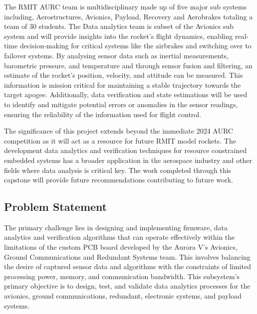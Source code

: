 The RMIT AURC team is multidisciplinary made up of five major sub systems including, Aerostructures, Avionics, Payload, Recovery and Aerobrakes totaling a team of 30 students. The Data analytics team is subset of the Avionics sub system and will provide insights into the rocket's flight dynamics, enabling real-time decision-making for critical systems like the airbrakes and switching over to failover systems. By analysing sensor data such as inertial measurements, barometric pressure, and temperature and through sensor fusion and filtering, an estimate of the rocket's position, velocity, and attitude can be measured. This information is mission critical for maintaining a stable trajectory towards the target apogee. Additionally, data verification and state estimations will be used to identify and mitigate potential errors or anomalies in the sensor readings, ensuring the reliability of the information used for flight control. 

The significance of this project extends beyond the immediate 2024 AURC competition as it will act as a resource for future RMIT model rockets. The development data analytics and verification techniques for resource constrained embedded systems has a broader application in the aerospace industry and other fields where data analysis is critical key. The work completed through this capstone will provide future recommendations contributing to future work.  

\subsection{Problem Statement}
The primary challenge lies in designing and implementing firmware, data analytics and verification algorithms that can operate effectively within the limitations of the custom PCB board developed by the Aurora V's Avionics, Ground Communications and Redundant Systems team. This involves balancing the desire of captured sensor data and algorithms with the constraints of limited processing power, memory, and communication bandwidth. This subsystem’s primary objective is to design, test, and validate data analytics processes for the avionics, ground communications, redundant, electronic systems, and payload systems. 

